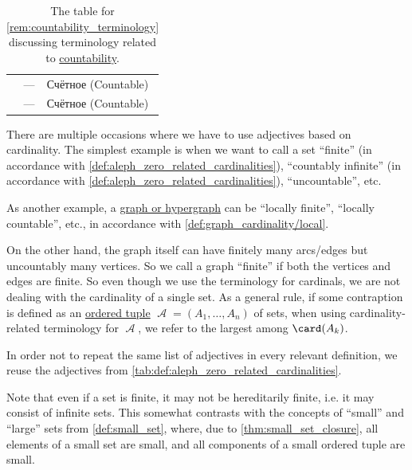 \begin{remark}
\begin{table}
\begin{tabular}{l l l}
      \cite[13]{ШеньВерещагин2020НачалаТеорииМножеств}                & ---                        & Счётное (Countable)             \\
      \cite[def. 1.3]{Александров1977ОбщаяТопология}                  & ---                        & Счётное (Countable)             \\
      \bottomrule
    \end{tabular}
    \caption{The table for \cref{rem:countability_terminology} discussing terminology related to \hyperref[def:aleph_zero_related_cardinalities]{countability}.}\label{tab:rem:countability_terminology}
  \end{table}
\end{remark}

\begin{remark}\label{rem:cardinality_auxiliary_terminology}
  There are multiple occasions where we have to use adjectives based on cardinality. The simplest example is when we want to call a set \enquote{finite} (in accordance with \cref{def:aleph_zero_related_cardinalities}), \enquote{countably infinite} (in accordance with \cref{def:aleph_zero_related_cardinalities}), \enquote{uncountable}, etc.

  As another example, a \hyperref[rem:graph_of_unspecified_type]{graph or hypergraph} can be \enquote{locally finite}, \enquote{locally countable}, etc., in accordance with \cref{def:graph_cardinality/local}.

  On the other hand, the graph itself can have finitely many arcs/edges but uncountably many vertices. So we call a graph \enquote{finite} if both the vertices and edges are finite. So even though we use the terminology for cardinals, we are not dealing with the cardinality of a single set. As a general rule, if some contraption is defined as an \hyperref[def:ordered_tuple]{ordered tuple} \( \mscrA = (A_1, \ldots, A_n) \) of sets, when using cardinality-related terminology for \( \mscrA \), we refer to the largest among \( \card(A_k) \).

  In order not to repeat the same list of adjectives in every relevant definition, we reuse the adjectives from \cref{tab:def:aleph_zero_related_cardinalities}.
\end{remark}
\begin{comments}
  \item Note that even if a set is finite, it may not be hereditarily finite, i.e. it may consist of infinite sets. This somewhat contrasts with the concepts of \enquote{small} and \enquote{large} sets from \cref{def:small_set}, where, due to \cref{thm:small_set_closure}, all elements of a small set are small, and all components of a small ordered tuple are small.
\end{comments}

